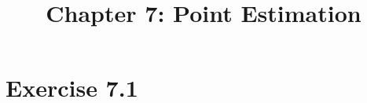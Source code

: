 \documentclass[12pt]{article}
\title{Chapter 7: Point Estimation}
\begin{document}
	\maketitle
	
	\section*{Exercise 7.1}
\end{document}

